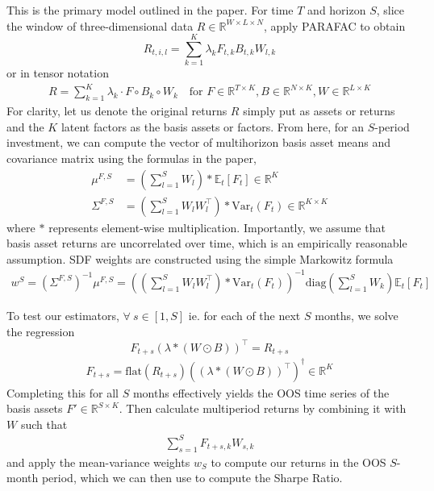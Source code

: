 \documentclass{article}
\newcommand{\E}{{\mathbb E}}
\newcommand{\R}{{\mathbb R}}
\begin{document}
This is the primary model outlined in the paper. For time $T$ and horizon $S$, slice the window of three-dimensional data $R \in \R^{W \times L \times N}$, apply PARAFAC to obtain 
\[R_{t, i, l} = \sum_{k=1}^K \lambda_k F_{t, k} B_{t, k} W_{l, k}\]
or in tensor notation
\begin{align}
    R = \sum_{k=1}^K \lambda_k \cdot F \circ B_k \circ W_k \ \ \ \text{ for } F \in \R^{T \times K}, B \in \R^{N \times K}, W \in \R^{L \times K} \label{parafac}
\end{align}
For clarity, let us denote the original returns $R$ simply put as assets or returns and the $K$ latent factors as the basis assets or factors. From here, for an $S$-period investment, 
we can compute the vector of multihorizon basis asset means and covariance matrix using the formulas in the paper, 
\begin{align}
    \mu^{F, S} &= \left( \sum_{l=1}^S W_l \right) * \E_t [F_t] \in \mathbb{R}^K \\
    \Sigma^{F, S} &= \left( \sum_{l=1}^S W_l W_l^\top\right) * \text{Var}_t(F_t) \in \mathbb{R}^{K \times K} \label{cov}
\end{align}
where $*$ represents element-wise multiplication. Importantly, we assume that basis asset returns are uncorrelated over time, which is an 
empirically reasonable assumption. SDF weights are constructed using the simple Markowitz formula
\begin{align}
    w^S = \left(\Sigma^{F, S} \right)^{-1} \mu^{F, S} = \left( \left( \sum_{l=1}^S W_l W_l^\top\right) * \text{Var}_t(F_t) \right)^{-1} \text{diag}\left(\sum_{l=1}^S W_k \right) \mathbb{E}_t [F_t]
\end{align}

To test our estimators, $\forall \ s \in [1, S]$ ie. for each of the next $S$ months, we solve the regression
\[F_{t+s} \left( \lambda * (W \odot B)\right)^\top = R_{t+s}\]
\begin{align}
    F_{t+s} = \text{flat}(R_{t+s}) ((\lambda * (W \odot B))^\top)^\dagger \in \mathbb{R}^{K} \label{F-OOS}
\end{align}
Completing this for all $S$ months effectively yields the OOS time series of the basis assets $F' \in \mathbb{R}^{S \times K}$. Then calculate multiperiod returns 
by combining it with $W$ such that 
\begin{align}
    \sum_{s=1}^S F_{t+s, k} W_{s, k} \label{get-multi-oos}
\end{align}
and apply the mean-variance weights $w_S$ to compute our returns in the OOS $S$-month period, 
which we can then use to compute the Sharpe Ratio. 
\end{document}
